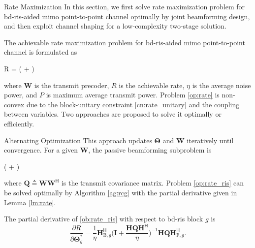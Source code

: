 \documentclass[journal]{IEEEtran}
\begin{document}
\begin{section}{Rate Maximization}
	\label{sc:rate}
	In this section, we first solve rate maximization problem for \gls{bd}-\gls{ris}-aided \gls{mimo} point-to-point channel optimally by joint beamforming design, and then exploit channel shaping for a low-complexity two-stage solution.

	The achievable rate maximization problem for \gls{bd}-\gls{ris}-aided \gls{mimo} point-to-point channel is formulated as
	\begin{maxi!}
		{}{R = \log \det \biggl( + \biggr)}{\label{op:rate}}{\label{ob:rate}}
	\end{maxi!}
	where $\mathbf{W}$ is the transmit precoder, $R$ is the achievable rate, $\eta$ is the average noise power, and $P$ is maximum average transmit power.
	Problem \eqref{op:rate} is non-convex due to the block-unitary constraint \eqref{cn:rate_unitary} and the coupling between variables.
	Two approaches are proposed to solve it optimally or efficiently.

	\begin{subsection}{Alternating Optimization}
		\label{sc:rate_ao}
		This approach updates $\mathbf{\Theta}$ and $\mathbf{W}$ iteratively until convergence.
		For a given $\mathbf{W}$, the passive beamforming subproblem is
		\begin{maxi!}
			{\scriptstyle{\mathbf{\Theta}}}{\log \det \biggl( + \biggr)}{\label{op:rate_ris}}{\label{ob:rate_ris}}
			\addConstraint{\mathbf{\Theta}_g^\mathsf{H} \mathbf{\Theta}_g=\mathbf{I}, \quad \forall g,}{}{}
		\end{maxi!}
		where $\mathbf{Q} \triangleq \mathbf{W} \mathbf{W}^\mathsf{H}$ is the transmit covariance matrix.
		Problem \eqref{op:rate_ris} can be solved optimally by Algorithm \ref{ag:rcg} with the partial derivative given in Lemma \ref{lm:rate}.
		\begin{lemma}
			\label{lm:rate}
			The partial derivative of \eqref{ob:rate_ris} with respect to \gls{bd}-\gls{ris} block $g$ is
			\begin{equation}
				\label{eq:gradient_eucl_rate}
				\frac{\partial R}{\partial \mathbf{\Theta}_g^*} = \frac{1}{\eta} \mathbf{H}_{\mathrm{B},g}^\mathsf{H} \biggl(\mathbf{I} + \frac{\mathbf{H}\mathbf{Q}\mathbf{H}^\mathsf{H}}{\eta}\biggr)^{-1} \mathbf{H} \mathbf{Q} \mathbf{H}_{\mathrm{F},g}^\mathsf{H}.
			\end{equation}
		\end{lemma}


\end{subsection}
\end{section}
\end{document}
